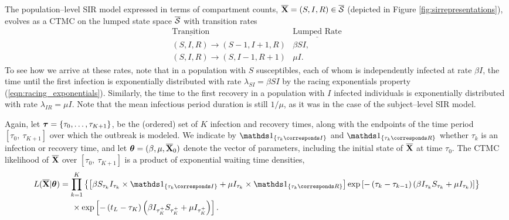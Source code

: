 The population--level SIR model expressed in terms of compartment counts, $ \overline{\mathbf{X}} = (S, I, R) \in \overline{\mathcal{S}} $ (depicted in Figure \ref{fig:sirrepresentations}), evolves as a CTMC on the lumped state space $ \overline{\mathcal{S}} $ with transition rates
\begin{equation*}
\begin{array}{cc}
\underline{\text{Transition}} & \underline{\text{Lumped Rate}} \\
(S,I,R) \longrightarrow (S-1,I+1,R) & \beta S I ,\\
(S,I,R) \longrightarrow (S,I-1,R+1) & \mu I .
\end{array}
\end{equation*}
To see how we arrive at these rates, note that in a population with $ S $ susceptibles, each of whom is independently infected at rate $ \beta I $, the time until the first infection is exponentially distributed with rate $ \lambda_{SI} = \beta SI $ by the racing exponentials property (\ref{eqn:racing_exponentials}). Similarly, the time to the first recovery in a population with $ I $ infected individuals is exponentially distributed with rate $\lambda_{IR} = \mu I $. Note that the mean infectious period duration is still $ 1/\mu $, as it was in the case of the subject--level SIR model.

Again, let $ \boldsymbol{\tau} = \lbrace\tau_0,\dots,\tau_{K+1}\rbrace $, be the (ordered) set of $ K $ infection and recovery times, along with the endpoints of the time period $ [\tau_0,\ \tau_{K+1}] $ over which the outbreak is modeled. We indicate by $ \ind{\tau_k \corresponds I} $ and $ \ind{\tau_k \corresponds R} $ whether $ \tau_k $ is an infection or recovery time, and let $ \boldsymbol{\theta} = (\beta, \mu, \overline{\mathbf{X}}_0) $ denote the vector of parameters, including the initial state of $ \overline{\mathbf{X}} $ at time $ \tau_0 $. The CTMC likelihood of $ \overline{\mathbf{X}} $ over $ [\tau_0,\ \tau_{K+1}] $ is a product of exponential waiting time densities,
\begin{align} 
\label{eqn:sir_pop_likelihood}
L(\overline{\bX}| \btheta) &= \prod_{k = 1}^{K}\left \lbrace \left [\beta S_{\tau_k} I_{\tau_k}\times\ind{\tau_k \corresponds I} + \mu I_{\tau_k}\times\ind{\tau_k \corresponds R}\right ] \exp{\left [-\left (\tau_k - \tau_{k-1}\right )\left (\beta I_{\tau_k} S_{\tau_k} + \mu I_{\tau_k}\right )\right ]}\right \rbrace \nonumber \\
& \hspace{0.2in} \times \exp \left [-\left (t_L - \tau_K\right )\left (\beta I_{\tau_K^+}S_{\tau_K^+} + \mu I_{\tau_K^+}\right )\right ]. 
\end{align} 

